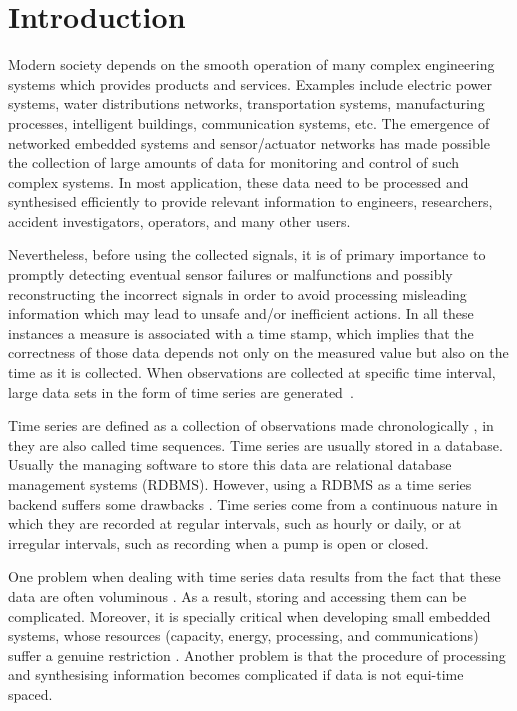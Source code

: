\section{Introduction}

Modern society depends on the smooth operation of many complex
engineering systems which provides products and services. Examples
include electric power systems, water distributions networks,
transportation systems, manufacturing processes, intelligent
buildings, communication systems, etc. The emergence of networked
embedded systems and sensor/actuator networks has made possible the
collection of large amounts of data for monitoring and control of such
complex systems. In most application, these data need to be processed
and synthesised efficiently to provide relevant information to
engineers, researchers, accident investigators, operators, and many
other users.  

Nevertheless, before using the collected signals, it is of primary
importance to promptly detecting eventual sensor failures or
malfunctions and possibly reconstructing the incorrect signals in
order to avoid processing misleading information which may lead to
unsafe and/or inefficient actions.  In all these instances a measure
is associated with a time stamp, which implies that the correctness of
those data depends not only on the measured value but also on the time
as it is collected. When observations are collected at specific time
interval, large data sets in the form of time series are
generated~\cite{basu07:_autom}.  

Time series are defined as a collection of observations made
chronologically \cite{fu11}, in \cite{last:hetland} they are also
called time sequences.  Time series are usually stored in a
database. Usually the managing software to store this data are
relational database management systems (RDBMS). However, using a RDBMS
as a time series backend suffers some drawbacks
\cite{dreyer94,schmidt95,stonebraker09:scidb,zhang11}. Time series
come from a continuous nature in which they are recorded at regular
intervals, such as hourly or daily, or at irregular intervals, such as
recording when a pump is open or closed.

One problem when dealing with time series data results from the fact
that these data are often voluminous \cite{fu11}. As a result, storing
and accessing them can be complicated. Moreover, it is specially
critical when developing small embedded systems, whose resources
(capacity, energy, processing, and communications) suffer a genuine
restriction \cite{yaogehrke02}.  Another problem is that the procedure
of processing and synthesising information becomes complicated if data
is not equi-time spaced.



